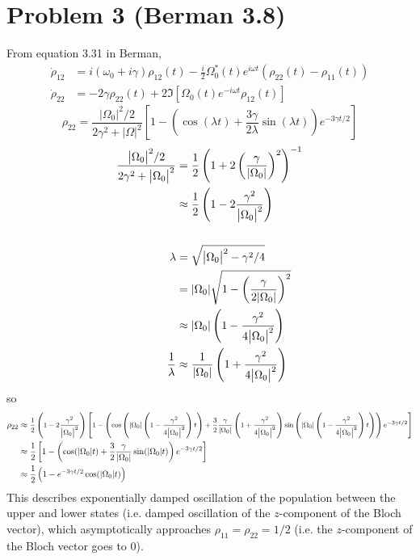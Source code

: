 \documentclass[12pt]{article}
\newcommand{\magsq}[1]{\big|#1\big|^2}
\begin{document}
\section*{Problem 3 (Berman 3.8)}
From equation 3.31 in Berman,
\begin{align*}
    \dot{\rho}_{12} &= i(\omega_0 + i\gamma)\rho_{12}(t) - \frac{i}{2}\Omega_0^*(t)e^{i\omega t}\left(\rho_{22}(t)-\rho_{11}(t)\right) \\
    \dot{\rho}_{22} &= -2\gamma\rho_{22}(t) + 2\Im[\Omega_0(t)e^{-i\omega t}\rho_{12}(t)]
\end{align*}
\[ \rho_{22} = \frac{\magsq{\Omega_0}/2}{2\gamma^2 + \magsq{\Omega}}\left[1 - \left(\cos(\lambda t) + \frac{3\gamma}{2\lambda}\sin(\lambda t)\right)e^{-3\gamma t/2}\right] \]
\begin{align*}
    \frac{\magsq{\Omega_0}/2}{2\gamma^2 + \magsq{\Omega_0}} &= \frac{1}{2}\left(1 + 2\left(\frac{\gamma}{\abs{\Omega_0}}\right)^2\right)^{-1} \\
    &\approx \frac{1}{2}\left(1 - 2\frac{\gamma^2}{\magsq{\Omega_0}}\right) \\
    \\
    \lambda &= \sqrt{\magsq{\Omega_0} - \gamma^2/4} \\
    &= \abs{\Omega_0}\sqrt{1 - \left(\frac{\gamma}{2\abs{\Omega_0}}\right)^2}\\
    &\approx \abs{\Omega_0}\left(1 - \frac{\gamma^2}{4\magsq{\Omega_0}}\right) \\
    \frac{1}{\lambda} &\approx \frac{1}{\abs{\Omega_0}}\left(1 + \frac{\gamma^2}{4\magsq{\Omega_0}}\right)
\end{align*}
so
\begin{align*}
    \rho_{22} &\approx \medmath{\frac{1}{2}\left(1 - 2\frac{\gamma^2}{\magsq{\Omega_0}}\right)\left[1 - \left(\cos\left(\abs{\Omega_0}\left(1 - \frac{\gamma^2}{4\magsq{\Omega_0}}\right)t\right)+\frac{3}{2}\frac{\gamma}{\abs{\Omega_0}}\left(1 + \frac{\gamma^2}{4\magsq{\Omega_0}}\right)\sin\left(\abs{\Omega_0}\left(1 - \frac{\gamma^2}{4\magsq{\Omega_0}}\right)t\right)\right)e^{-3\gamma t/2}\right]} \\
    &\approx \frac{1}{2}\left[1 - \left(\cos(\abs{\Omega_0}t) + \frac{3}{2}\frac{\gamma}{\abs{\Omega_0}}\sin(\abs{\Omega_0}t)\right)e^{-3\gamma t/2}\right] \\
    &\approx \frac{1}{2}\left(1 - e^{-3\gamma t/2}\cos(\abs{\Omega_0}t)\right)
\end{align*}
This describes exponentially damped oscillation of the population between the upper and lower states (i.e. damped oscillation of the $z$-component of the Bloch vector), which asymptotically approaches $\rho_{11} = \rho_{22} = 1/2$ (i.e. the $z$-component of the Bloch vector goes to 0).
\end{document}
